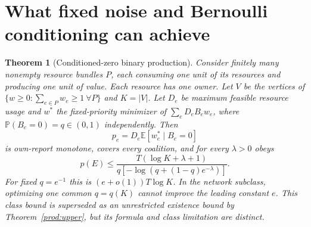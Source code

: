 \documentclass[11pt]{article}
\newtheorem{theorem}{Theorem}[section]
\theoremstyle{definition}\newtheorem{definition}[theorem]{Definition}
\theoremstyle{remark}\newtheorem{remark}[theorem]{Remark}
\newcommand{\E}{\mathbb E}
\newcommand{\Prob}{\mathbb P}
\begin{document}
\section{What fixed noise and Bernoulli conditioning can achieve}\label{noise:laws}
\begin{theorem}[Conditioned-zero binary production]\label{noise:bernoulli}
Consider finitely many nonempty resource bundles $P$, each consuming one
unit of its resources and producing one unit of value. Each resource has
one owner. Let $V$ be the vertices of
$\{w\ge0:\sum_{e\in P}w_e\ge1\ \forall P\}$ and $K=|V|$.
Let $D_e$ be maximum feasible resource usage and $w^*$ the fixed-priority
minimizer of $\sum_eD_eB_ew_e$, where $\Prob(B_e=0)=q\in(0,1)$ independently.
Then
\[
 p_e=D_e\E[w_e^*\mid B_e=0]
\]
is own-report monotone, covers every coalition, and for every $\lambda>0$
obeys
\[
 p(E)\le\frac{T(\log K+\lambda+1)}
 {q[-\log(q+(1-q)e^{-\lambda})]}.
\]
For fixed $q=e^{-1}$ this is $(e+o(1))T\log K$. In the network subclass,
optimizing one common $q=q(K)$ cannot improve the leading constant $e$.
This class bound is superseded as an unrestricted existence bound by
Theorem~\ref{prod:upper}, but its formula and class limitation are distinct.
\end{theorem}
\end{document}
